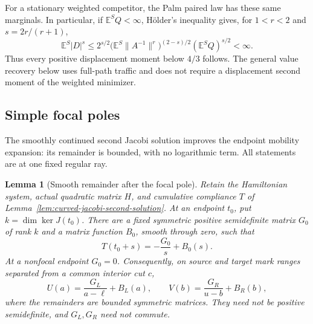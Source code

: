 \documentclass[11pt,reqno]{amsart}
\newtheorem{lemma}[theorem]{Lemma}
\theoremstyle{definition}
\theoremstyle{remark}
\numberwithin{equation}{section}
\newcommand{\E}{\mathbb E}
\begin{document}
For a stationary weighted competitor, the Palm paired law has these
same marginals. In particular, if \(\E^S Q<\infty\), H\"older's
inequality gives, for \(1<r<2\) and \(s=2r/(r+1)\),
\[
 \E^S|D|^s
 \le2^{s/2}\bigl(\E^S\|A^{-1}\|^r\bigr)^{(2-s)/2}
                   (\E^S Q)^{s/2}<\infty.
\]
Thus every positive displacement moment below \(4/3\) follows.
The general value recovery below uses full-path traffic and does not
require a displacement second moment of the weighted minimizer.

\subsection{Simple focal poles}
\label{subsec:focal-simple-pole-dini}

The smoothly continued second Jacobi solution improves the endpoint
mobility expansion: its remainder is bounded, with no logarithmic term.
All statements are at one fixed regular ray.

\begin{lemma}[Smooth remainder after the focal pole]
\label{lem:focal-simple-pole}
Retain the Hamiltonian system, actual quadratic matrix \(H\), and
cumulative compliance \(T\) of
Lemma~\ref{lem:curved-jacobi-second-solution}. At an endpoint \(t_0\),
put \(k=\dim\ker J(t_0)\). There are a fixed symmetric positive
semidefinite matrix \(G_0\) of rank \(k\) and a matrix function
\(B_0\), smooth through zero, such that
\begin{equation}
 T(t_0+s)=-\frac{G_0}{s}+B_0(s).
 \label{eq:focal-simple-pole}
\end{equation}
At a nonfocal endpoint \(G_0=0\). Consequently, on source and target
mark ranges separated from a common interior cut \(c\),
\begin{equation}
 U(a)=\frac{G_L}{a-\ell}+B_L(a),\qquad
 V(b)=\frac{G_R}{u-b}+B_R(b),
 \label{eq:focal-two-residues}
\end{equation}
where the remainders are bounded symmetric matrices. They need not be
positive semidefinite, and \(G_L,G_R\) need not commute.
\end{lemma}
\end{document}
